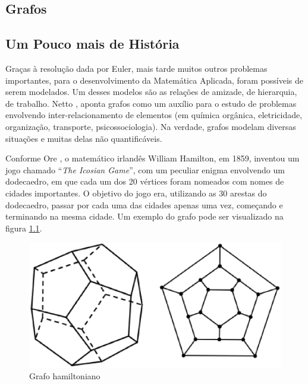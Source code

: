 \begin{apendicesenv}

\partapendices

\chapter{Grafos}

\section{Um Pouco mais de História}

Graças à resolução dada por Euler, mais tarde muitos outros problemas importantes, para o desenvolvimento da Matemática Aplicada, foram possíveis de serem modelados. Um desses modelos são as relações de amizade, de hierarquia, de trabalho. Netto \cite{Netto:2012}, aponta grafos como um auxílio para o estudo de problemas envolvendo inter-relacionamento de elementos (em química orgânica, eletricidade, organização, transporte, psicossociologia). Na verdade, grafos modelam diversas situações e muitas delas não quantificáveis.

Conforme Ore \cite{Ore:1963}, o matemático irlandês William Hamilton, em 1859, inventou um jogo chamado ``\textit{The Icosian Game}'', com um peculiar enigma envolvendo um dodecaedro, em que cada um dos 20 vértices foram nomeados com nomes de cidades importantes. O objetivo do jogo era, utilizando as 30 arestas do dodecaedro, passar por cada uma das cidades apenas uma vez, começando e terminando na mesma cidade. Um exemplo do grafo pode ser visualizado na figura \ref{grafo_hamiltoniano}.

\begin{figure}[!h]
	\centering
	\includegraphics[scale=0.3]{figuras/capitulo2/grafo_hamiltoniano.eps}
	\caption[Grafo hamiltoniano]{Grafo hamiltoniano \cite{Ore:1963}}
	\label{grafo_hamiltoniano}
\end{figure}


\end{apendicesenv}
